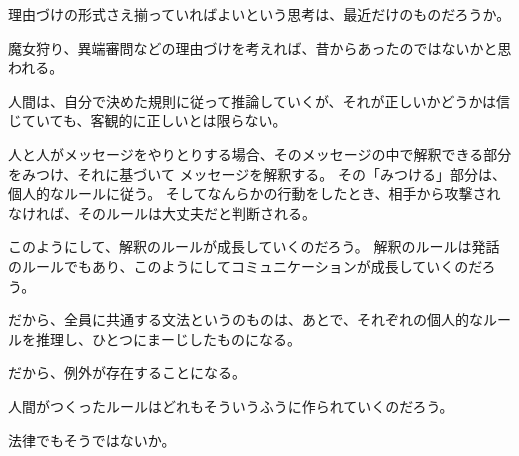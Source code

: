 \documentclass[10pt, oneside]{jarticle}   	%
\begin{document}
理由づけの形式さえ揃っていればよいという思考は、最近だけのものだろうか。

魔女狩り、異端審問などの理由づけを考えれば、昔からあったのではないかと思われる。

人間は、自分で決めた規則に従って推論していくが、それが正しいかどうかは信じていても、客観的に正しいとは限らない。

人と人がメッセージをやりとりする場合、そのメッセージの中で解釈できる部分をみつけ、それに基づいて
メッセージを解釈する。
その「みつける」部分は、個人的なルールに従う。
そしてなんらかの行動をしたとき、相手から攻撃されなければ、そのルールは大丈夫だと判断される。

このようにして、解釈のルールが成長していくのだろう。
解釈のルールは発話のルールでもあり、このようにしてコミュニケーションが成長していくのだろう。

だから、全員に共通する文法というのものは、あとで、それぞれの個人的なルールを推理し、ひとつにまーじしたものになる。

だから、例外が存在することになる。

人間がつくったルールはどれもそういうふうに作られていくのだろう。

法律でもそうではないか。
\end{document}
